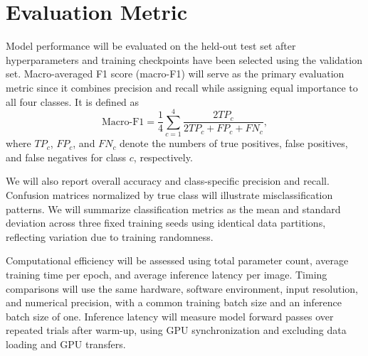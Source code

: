 \documentclass{article}
\begin{document}
\section*{Evaluation Metric}
Model performance will be evaluated on the held-out test set after hyperparameters and training checkpoints have been selected using the
validation set. Macro-averaged F1 score (macro-F1) will serve as the primary evaluation metric since it combines precision and recall while
assigning equal importance to all four classes. It is defined as
\[
\mathrm{Macro\text{-}F1}
=\frac{1}{4}\sum_{c=1}^{4}
\frac{2TP_c}{2TP_c+FP_c+FN_c},
\]
where \(TP_c\), \(FP_c\), and \(FN_c\) denote the numbers of true positives, false positives, and false negatives for class \(c\), respectively.

We will also report overall accuracy and class-specific precision and recall. Confusion matrices normalized by true class will illustrate misclassification 
patterns. We will summarize classification metrics as the mean and standard deviation across three fixed training seeds using identical data partitions, 
reflecting variation due to training randomness.

Computational efficiency will be assessed using total parameter count, average training time per epoch, and average inference latency per image. Timing 
comparisons will use the same hardware, software environment, input resolution, and numerical precision, with a common training batch size and an inference batch 
size of one. Inference latency will measure model forward passes over repeated trials after warm-up, using GPU synchronization and excluding data loading and GPU 
transfers.
\end{document}

